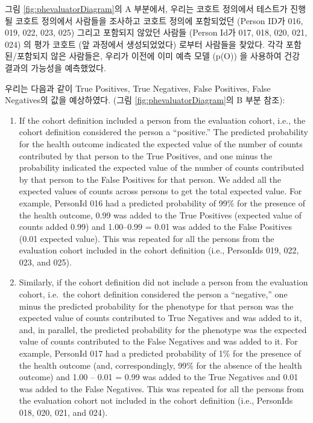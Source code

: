 \documentclass[11pt]{book}
\theoremstyle{definition}
\theoremstyle{definition}
\theoremstyle{definition}
\theoremstyle{remark}
\begin{document}
그림 \ref{fig:phevaluatorDiagram}의 A 부분에서, 우리는 코호트 정의에서
테스트가 진행될 코호트 정의에서 사람들을 조사하고 코호트 정의에
포함되었던 (Person ID가 016, 019, 022, 023, 025) 그리고 포함되지 않았던
사람들 (Person Id가 017, 018, 020, 021, 024) 의 평가 코호트 (앞 과정에서
생성되었었다) 로부터 사람들을 찾았다. 각각 포함된/포함되지 않은
사람들은, 우리가 이전에 이미 예측 모델 (p(O)) 을 사용하여 건강 결과의
가능성을 예측했었다.

우리는 다음과 같이 True Positives, True Negatives, False Positives,
False Negatives의 값을 예상하였다. (그림 \ref{fig:phevaluatorDiagram}의
B 부분 참조):

\begin{enumerate}
\def\labelenumi{\arabic{enumi}.}
\item
  If the cohort definition included a person from the evaluation cohort,
  i.e., the cohort definition considered the person a ``positive.'' The
  predicted probability for the health outcome indicated the expected
  value of the number of counts contributed by that person to the True
  Positives, and one minus the probability indicated the expected value
  of the number of counts contributed by that person to the False
  Positives for that person. We added all the expected values of counts
  across persons to get the total expected value. For example, PersonId
  016 had a predicted probability of 99\% for the presence of the health
  outcome, 0.99 was added to the True Positives (expected value of
  counts added 0.99) and 1.00--0.99 = 0.01 was added to the False
  Positives (0.01 expected value). This was repeated for all the persons
  from the evaluation cohort included in the cohort definition (i.e.,
  PersonIds 019, 022, 023, and 025).
\item
  Similarly, if the cohort definition did not include a person from the
  evaluation cohort, i.e.~the cohort definition considered the person a
  ``negative,'' one minus the predicted probability for the phenotype
  for that person was the expected value of counts contributed to True
  Negatives and was added to it, and, in parallel, the predicted
  probability for the phenotype was the expected value of counts
  contributed to the False Negatives and was added to it. For example,
  PersonId 017 had a predicted probability of 1\% for the presence of
  the health outcome (and, correspondingly, 99\% for the absence of the
  health outcome) and 1.00 -- 0.01 = 0.99 was added to the True
  Negatives and 0.01 was added to the False Negatives. This was repeated
  for all the persons from the evaluation cohort not included in the
  cohort definition (i.e., PersonIds 018, 020, 021, and 024).
\end{enumerate}
\end{document}
